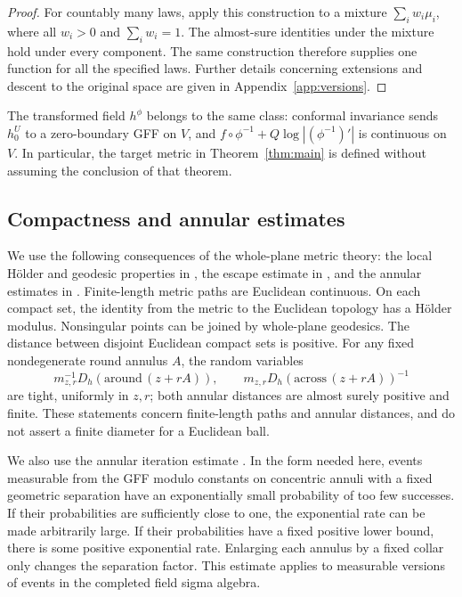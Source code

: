\documentclass[11pt]{article}
\theoremstyle{definition}
\theoremstyle{remark}
\begin{document}
\begin{proof}
For countably many laws, apply this construction to a mixture
$\sum_i w_i\mu_i$, where all $w_i>0$ and $\sum_iw_i=1$.
The almost-sure identities under the mixture hold under every
component. The same construction therefore supplies one function
for all the specified laws. Further details concerning extensions
and descent to the original space are given in
Appendix~\ref{app:versions}.
\end{proof}

The transformed field $h^\phi$ belongs to the same class: conformal
invariance sends $h_0^U$ to a zero-boundary GFF on $V$, and
$f\circ\phi^{-1}+Q\log|(\phi^{-1})'|$ is continuous on $V$.
In particular, the target metric in Theorem~\ref{thm:main} is
defined without assuming the conclusion of that theorem.

\subsection{Compactness and annular estimates}
We use the following consequences of the whole-plane metric theory:
the local H\"older and geodesic properties in
\cite[Propositions 1.10 and 1.12]{Pfeffer}, the escape estimate in
\cite[Lemma 3.12]{Pfeffer}, and the annular estimates in
\cite[Section 2.5]{DG}. Finite-length metric paths are Euclidean
continuous. On each compact set, the identity from the metric to
the Euclidean topology has a H\"older modulus. Nonsingular points
can be joined by whole-plane geodesics. The distance between
disjoint Euclidean compact sets is positive. For any fixed
nondegenerate round annulus $A$, the random variables
\begin{equation}\label{eq:ann-tight}
 m_{z,r}^{-1}D_h(\mathrm{around}\,(z+rA)),\qquad
 m_{z,r}D_h(\mathrm{across}\,(z+rA))^{-1}
\end{equation}
are tight, uniformly in $z,r$; both annular distances are almost
surely positive and finite. These statements concern finite-length
paths and annular distances, and do not assert a finite diameter
for a Euclidean ball.

We also use the annular iteration estimate
\cite[Lemma 2.1]{DG}. In the form needed here, events measurable
from the GFF modulo constants on concentric annuli with a fixed
geometric separation have an exponentially small probability of
too few successes. If their probabilities are sufficiently close
to one, the exponential rate can be made arbitrarily large. If
their probabilities have a fixed positive lower bound, there is
some positive exponential rate. Enlarging each annulus by a fixed
collar only changes the separation factor. This estimate applies
to measurable versions of events in the completed field sigma
algebra.
\end{document}
